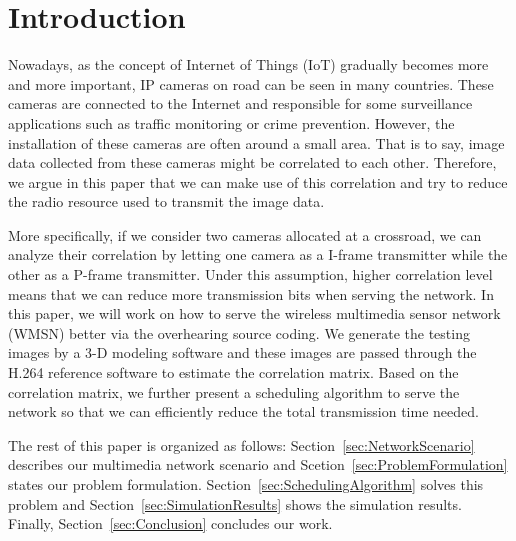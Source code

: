 \section{Introduction}
\label{sec:Introduction}
Nowadays, as the concept of Internet of Things (IoT) gradually becomes more and
more important, IP cameras on road can be seen in many countries.
These cameras are connected to the Internet and responsible for some
surveillance applications such as traffic monitoring or crime prevention.
However, the installation of these cameras are often around a small area.
That is to say, image data collected from these cameras might be correlated to
each other.
Therefore, we argue in this paper that we can make use of this correlation and
try to reduce the radio resource used to transmit the image data.

More specifically, if we consider two cameras allocated at a crossroad, we can
analyze their correlation by letting one camera as a I-frame transmitter while
the other as a P-frame transmitter.
Under this assumption, higher correlation level means that we can reduce more
transmission bits when serving the network.
In this paper, we will work on how to serve the wireless multimedia sensor
network (WMSN) better via the overhearing source coding.
We generate the testing images by a 3-D modeling software and these images are
passed through the H.264 reference software to estimate the correlation matrix.
Based on the correlation matrix, we further present a scheduling algorithm to
serve the network so that we can efficiently reduce the total transmission time
needed.

The rest of this paper is organized as follows:
Section~\ref{sec:NetworkScenario} describes our multimedia network scenario and
Scetion~\ref{sec:ProblemFormulation} states our problem formulation.
Section~\ref{sec:SchedulingAlgorithm} solves this problem and
Section~\ref{sec:SimulationResults} shows the simulation results.
Finally, Section~\ref{sec:Conclusion} concludes our work.